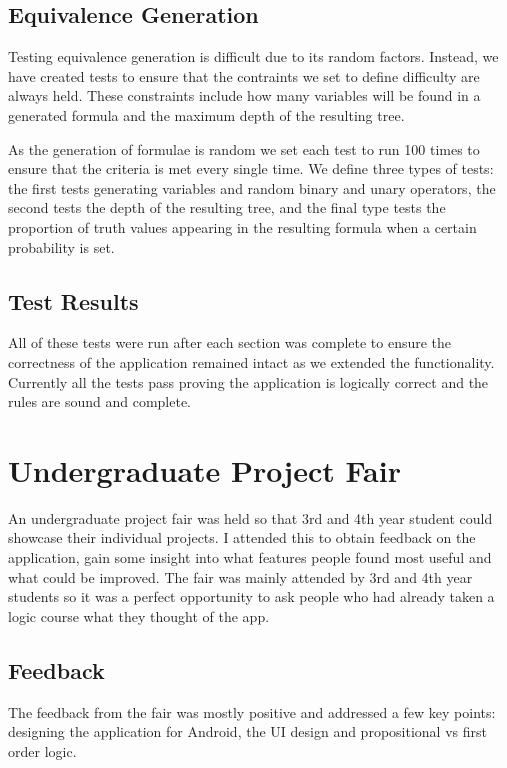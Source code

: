\documentclass{report}
\begin{document}
\subsection{Equivalence Generation}

Testing equivalence generation is difficult due to its random factors. Instead, we have created tests to ensure that the contraints we set to define difficulty are always held. These constraints include how many variables will be found in a generated formula and the maximum depth of the resulting tree.

As the generation of formulae is random we set each test to run 100 times to ensure that the criteria is met every single time. We define three types of tests: the first tests generating variables and random binary and unary operators, the second tests the depth of the resulting tree, and the final type tests the proportion of truth values appearing in the resulting formula when a certain probability is set.

\subsection{Test Results}

All of these tests were run after each section was complete to ensure the correctness of the application remained intact as we extended the functionality. Currently all the tests pass proving the application is logically correct and the rules are sound and complete.

\section{Undergraduate Project Fair}

An undergraduate project fair was held so that 3rd and 4th year student could showcase their individual projects. I attended this to obtain feedback on the application, gain some insight into what features people found most useful and what could be improved. The fair was mainly attended by 3rd and 4th year students so it was a perfect opportunity to ask people who had already taken a logic course what they thought of the app.

\subsection{Feedback}

The feedback from the fair was mostly positive and addressed a few key points: designing the application for Android, the UI design and propositional vs first order logic.
\end{document}
